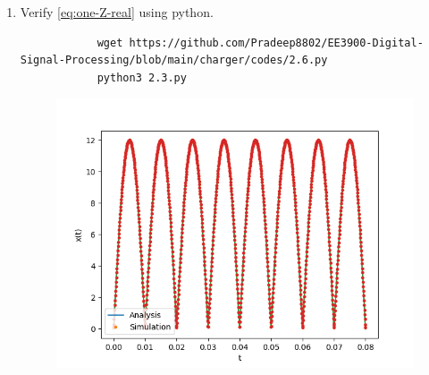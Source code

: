 \documentclass[journal,12pt,twocolumn]{IEEEtran}
\renewcommand\thesection{\arabic{section}}
\begin{document}
\begin{enumerate}[label=\thesection.\arabic*,ref=\thesection.\theenumi]
		\item Verify 
		\eqref{eq:one-Z-real}
		using python.\\
		\solution 
		\begin{lstlisting}
			wget https://github.com/Pradeep8802/EE3900-Digital-Signal-Processing/blob/main/charger/codes/2.6.py
			python3 2.3.py
		\end{lstlisting}
		\begin{figure}[!ht]
			\centering
			\includegraphics[width=\columnwidth]{./figs/2_6.png}
			\caption{}
		\end{figure}
	\end{enumerate}
\end{document}
